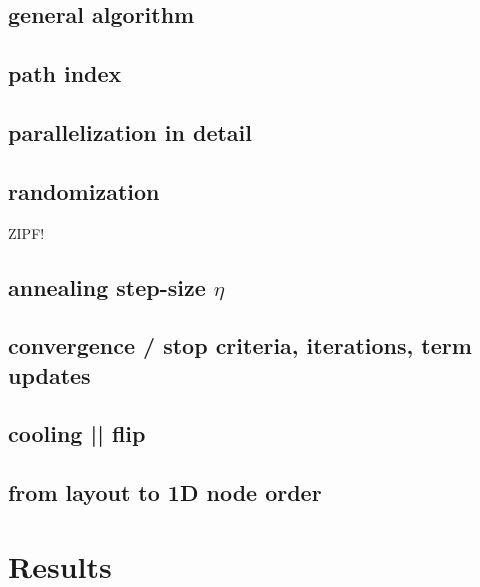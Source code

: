 \documentclass{bioinfo}
\theoremstyle{definition}
\begin{document}
	\subsection{general algorithm}
	\subsection{path index}
	\subsection{parallelization in detail}
	\subsection{randomization}
	ZIPF!
	\subsection{annealing step-size $\eta$}
	\subsection{convergence / stop criteria, iterations, term updates}
	\subsection{cooling || flip}
	\subsection{from layout to 1D node order}
	
	

    \iffalse
    Fig. 1: Describe how our approach works, especially a single update operation (Fig. \ref{fig:sketches}). Explanation of 1D graph updating in Figures \ref{fig:1d_before_update}-\ref{fig:1d_after_update}. Explanation of 2D graph updating in Figures \ref{fig:2d_before_update}-\ref{fig:2d_after_update}. Zipfian distribution.

    
    \fi

    \iffalse


    \section{Results}
    \label{sec:results}

\end{document}
